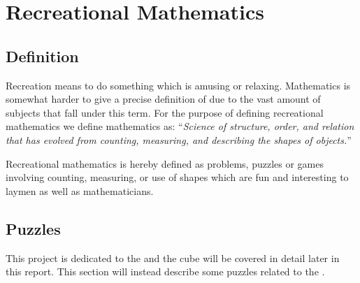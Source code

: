 \chapter{Recreational Mathematics}
\label{chap:recreationalMathematics}

\section{Definition}
Recreation means to do something which is amusing or relaxing. Mathematics is somewhat harder to give a precise definition of due to the vast amount of subjects that fall under this term.
For the purpose of defining recreational mathematics we define mathematics as:
``\emph{Science of structure, order, and relation that has evolved from counting, measuring, and describing the shapes of objects.}''\cite{mathDef2}

Recreational mathematics is hereby defined as problems, puzzles or games involving counting, measuring, or use of shapes which are fun and interesting to laymen as well as mathematicians. \cite{Singmaster98} \cite[p. 18]{Trigg78}
\section{Puzzles}
This project is dedicated to the \rubik{} and the cube will be covered in detail later in this report. This section will instead describe some puzzles related to the \rubik{}.

	 
	 
	 
	
